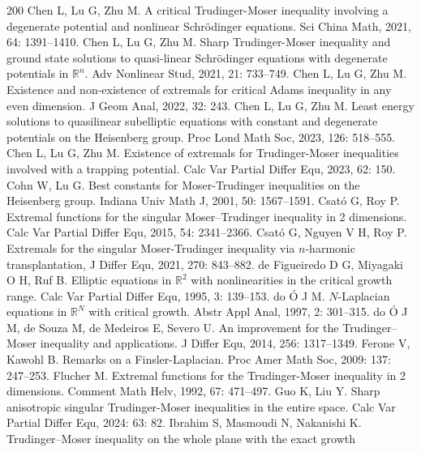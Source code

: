 \documentclass[11pt]{article}
\theoremstyle{plain}
\numberwithin{equation}{section}
\begin{document}
\begin{thebibliography}{200}
 Chen L, Lu G, Zhu M. A critical Trudinger-Moser inequality involving a degenerate
potential and nonlinear Schr\"{o}dinger equations. Sci China Math,   2021, 64: 1391--1410.
  Chen L, Lu G, Zhu M. Sharp Trudinger-Moser inequality and ground state solutions
to quasi-linear Schr\"{o}dinger equations with degenerate potentials in $\mathbb{R}^{n}$. Adv Nonlinear
Stud, 2021, 21: 733--749.
 Chen L, Lu G, Zhu M. Existence and non-existence of extremals for critical Adams
inequality in any even dimension. J Geom Anal, 2022, 32: 243.
 Chen L, Lu G, Zhu M. Least energy solutions to quasilinear subelliptic equations
with constant and degenerate potentials on the Heisenberg group. Proc Lond Math
Soc,  2023, 126: 518--555.
 Chen L, Lu G, Zhu M. Existence of extremals for Trudinger-Moser inequalities
involved with a trapping potential. Calc Var Partial Differ Equ, 2023, 62: 150.
 Cohn W,  Lu G. Best constants for Moser-Trudinger inequalities on the Heisenberg group. Indiana Univ Math J, 2001, 50: 1567--1591.
  Csat\'{o} G,  Roy P.  Extremal functions for the singular Moser--Trudinger inequality in 2 dimensions. Calc Var Partial Differ Equ, 2015, 54: 2341--2366.
 Csat\'{o} G, Nguyen V H, Roy P. Extremals for the singular Moser-Trudinger inequality via $n$-harmonic transplantation, J Differ Equ, 2021, 270: 843--882.
 de Figueiredo D G, Miyagaki O H, Ruf B.
Elliptic equations in $\mathbb{R}^2$ with nonlinearities in the critical growth range.
Calc Var Partial Differ Equ, 1995, 3: 139--153.
  do \'{O} J M. $N$-Laplacian equations in $\mathbb{R}^{N}$ with critical growth. Abstr Appl Anal, 1997, 2: 301--315.
  do \'{O} J M, de Souza M,  de Medeiros E,  Severo U.  An improvement for the Trudinger--Moser inequality and applications.
J Differ Equ,  2014, 256: 1317--1349.
  Ferone V,  Kawohl B. Remarks on a Finsler-Laplacian. Proc Amer Math Soc, 2009: 137: 247--253.
  Flucher M. Extremal functions for the Trudinger-Moser inequality in 2 dimensions. Comment Math Helv,  1992, 67: 471--497.
 Guo K,  Liu Y. Sharp anisotropic singular Trudinger-Moser inequalities in the entire space. Calc Var Partial Differ Equ,  2024: 63: 82.
  Ibrahim S, Masmoudi N, Nakanishi K.  Trudinger--Moser inequality on the whole plane with the exact growth

\end{thebibliography}
\end{document}
